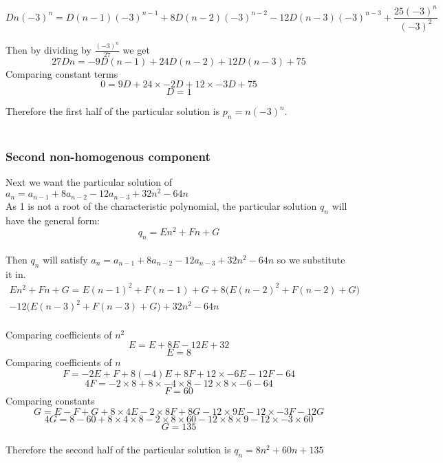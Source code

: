 \documentclass{article}
\begin{document}
\[ Dn(-3)^n = D(n-1)(-3)^{n-1} + 8D(n-2)(-3)^{n-2} - 12D(n-3)(-3)^{n-3} + \frac{25(-3)^n}{(-3)^2} \]


Then by dividing by $\frac{(-3)^n}{27}$ we get
\[ 27Dn = -9 D(n-1) + 24 D(n-2) + 12 D(n-3) + 75 \]
Comparing constant terms
\[ 0 = 9D + 24\times -2 D + 12 \times -3 D + 75 \]
\[ D = 1\]

Therefore the first half of the particular solution is $p_n = n(-3)^n$.
\\
\\
\subsubsection*{Second non-homogenous component}

Next we want the particular solution of $a_n = a_{n-1} + 8 a_{n-2} - 12 a_{n-3} + 32n^2 - 64n$
\\

As 1 is not a root of the characteristic polynomial, the particular solution $q_n$ will have the general form:
\[ q_n = En^2 + Fn + G \] %
\\
Then $q_n$ will satisfy $a_n = a_{n-1} + 8 a_{n-2} - 12 a_{n-3} + 32n^2 - 64n$ so we substitute it in.
\begin{multline*}
  En^2 + Fn + G = E(n-1)^2 + F(n-1) + G + 8 \Big( E(n-2)^2 + F(n-2) + G \Big) \\
   - 12 \Big( E(n-3)^2 + F(n-3) + G \Big) + 32n^2 - 64n
\end{multline*}
\\
Comparing coefficients of $n^2$
\[ E = E + 8E -12E + 32 \]
\[ E = 8 \]
Comparing coefficients of $n$
\[ F = -2E + F + 8(-4)E + 8F + 12\times-6E - 12F - 64 \]
\[ 4F = -2\times8 + 8\times-4\times8 - 12\times8\times-6 - 64 \]
\[ F = 60 \]
Comparing constants
\[ G = E - F + G + 8\times 4 E - 2 \times 8 F + 8G -12 \times 9E - 12\times -3F - 12G \]
\[ 4G = 8-60+8\times4\times8-2\times8\times60-12\times8\times9-12\times-3\times60 \]
\[ G = 135 \]
\\
Therefore the second half of the particular solution is $q_n = 8n^2 + 60n + 135$
\end{document}
